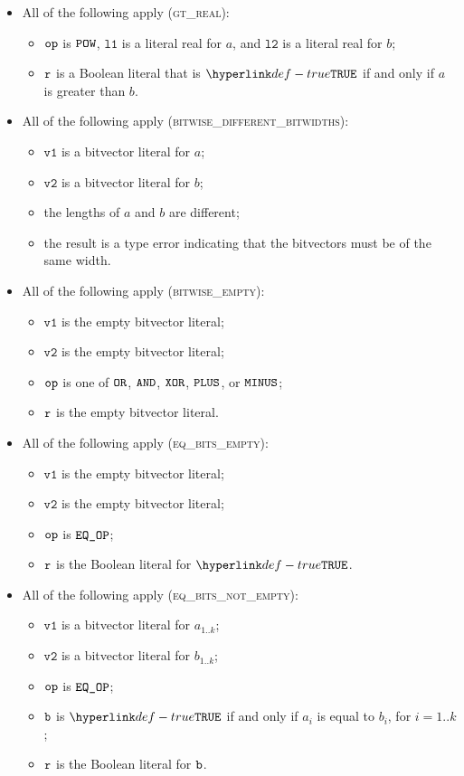 \documentclass{book}
\newcommand\vvone[0]{\texttt{v1}}
\newcommand\vvtwo[0]{\texttt{v2}}
\newcommand\vlone[0]{\texttt{l1}}
\newcommand\vltwo[0]{\texttt{l2}}
\begin{document}
\begin{itemize}
  \item All of the following apply (\textsc{gt\_real}):
  \begin{itemize}
    \item $\texttt{op}$ is $\texttt{POW}$, $\vlone$ is a literal real for $a$, and $\vltwo$ is a literal real for $b$;
    \item $\texttt{r}$ is a Boolean literal that is $\True$ if and only if $a$ is greater than $b$.
  \end{itemize}

  \item All of the following apply (\textsc{bitwise\_different\_bitwidths}):
  \begin{itemize}
    \item $\vvone$ is a bitvector literal for $a$;
    \item $\vvtwo$ is a bitvector literal for $b$;
    \item the lengths of $a$ and $b$ are different;
    \item the result is a type error indicating that the bitvectors must be of the same width.
  \end{itemize}

  \item All of the following apply (\textsc{bitwise\_empty}):
  \begin{itemize}
    \item $\vvone$ is the empty bitvector literal;
    \item $\vvtwo$ is the empty bitvector literal;
    \item $\texttt{op}$ is one of $\texttt{OR}$, $\texttt{AND}$, $\texttt{XOR}$, $\texttt{PLUS}$, or $\texttt{MINUS}$;
    \item $\texttt{r}$ is the empty bitvector literal.
  \end{itemize}

  \item All of the following apply (\textsc{eq\_bits\_empty}):
  \begin{itemize}
    \item $\vvone$ is the empty bitvector literal;
    \item $\vvtwo$ is the empty bitvector literal;
    \item $\texttt{op}$ is $\texttt{EQ\_OP}$;
    \item $\texttt{r}$ is the Boolean literal for $\True$.
  \end{itemize}

  \item All of the following apply (\textsc{eq\_bits\_not\_empty}):
  \begin{itemize}
    \item $\vvone$ is a bitvector literal for $a_{1..k}$;
    \item $\vvtwo$ is a bitvector literal for $b_{1..k}$;
    \item $\texttt{op}$ is $\texttt{EQ\_OP}$;
    \item $\texttt{b}$ is $\True$ if and only if $a_i$ is equal to $b_i$, for $i=1..k$;
    \item $\texttt{r}$ is the Boolean literal for $\texttt{b}$.
  \end{itemize}


\end{itemize}
\end{document}

